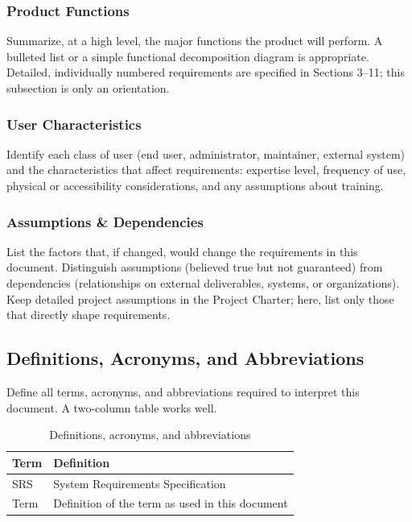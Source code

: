 \subsubsection{Product Functions}
Summarize, at a high level, the major functions the product will perform. A bulleted list or a simple functional decomposition diagram is appropriate. Detailed, individually numbered requirements are specified in Sections 3--11; this subsection is only an orientation.

\subsubsection{User Characteristics}
Identify each class of user (end user, administrator, maintainer, external system) and the characteristics that affect requirements: expertise level, frequency of use, physical or accessibility considerations, and any assumptions about training.

\subsubsection{Assumptions \& Dependencies}
List the factors that, if changed, would change the requirements in this document. Distinguish assumptions (believed true but not guaranteed) from dependencies (relationships on external deliverables, systems, or organizations). Keep detailed project assumptions in the Project Charter; here, list only those that directly shape requirements.

\subsection{Definitions, Acronyms, and Abbreviations}
Define all terms, acronyms, and abbreviations required to interpret this document. A two-column table works well.

\begin{table}[H]
\caption{Definitions, acronyms, and abbreviations}
\begin{center}
    \begin{tabular}{ | p{3cm} | p{10cm} |}
    \hline
    \textbf{Term} & \textbf{Definition} \\ \hline
    SRS & System Requirements Specification \\ \hline
    Term & Definition of the term as used in this document \\ \hline
    \end{tabular}
\end{center}
\end{table}
